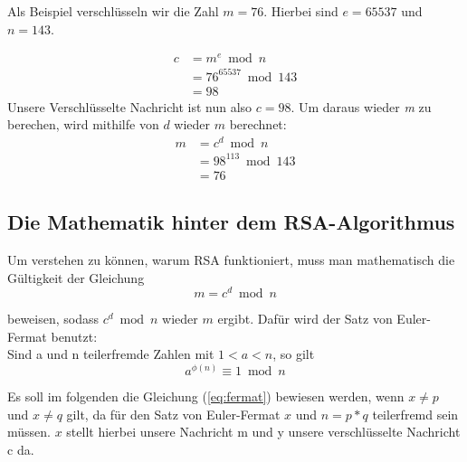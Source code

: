 \documentclass[12pt,a4paper]{scrartcl}
\begin{document}
	
	Als Beispiel verschlüsseln wir die Zahl $m = 76$. Hierbei sind $e=65537$ und $n=143$.

	\begin{equation}
	\begin{split}
	c & = m^e \bmod n \\
	 &  = 76^{65537} \bmod 143 \\
 	& = 98
	\end{split}
	\end{equation}
	Unsere Verschlüsselte Nachricht ist nun also $c = 98$. Um daraus wieder \textit{m} zu berechen, wird mithilfe von $d$ wieder $m$ berechnet:
	\begin{equation}
	\begin{split}
	m & = c^d \bmod n \\
	 &  = 98^{113} \bmod 143 \\
 	& = 76
	\end{split}
	\end{equation}

	\subsection{Die Mathematik hinter dem RSA-Algorithmus}
	Um verstehen zu können, warum RSA funktioniert, muss man mathematisch die Gültigkeit der Gleichung
	\begin{equation}\label{eq:fermat}
 m = c^d \bmod n
 \end{equation}

 beweisen, sodass $c^d \bmod n$ wieder $m$ ergibt. Dafür wird der Satz von Euler-Fermat benutzt: \\
	Sind a und n teilerfremde Zahlen mit $1 < a < n$, so gilt
	$$a^{\phi (n)} \equiv 1 \bmod n $$
	
	Es soll im folgenden die Gleichung (\ref{eq:fermat}) bewiesen werden, wenn $x \neq p$ und $x \neq q$ gilt, da für den Satz von Euler-Fermat $x$ und $n = p*q$ teilerfremd sein müssen. $x$ stellt hierbei unsere Nachricht m und y unsere verschlüsselte Nachricht c da. \\
	
\end{document}
